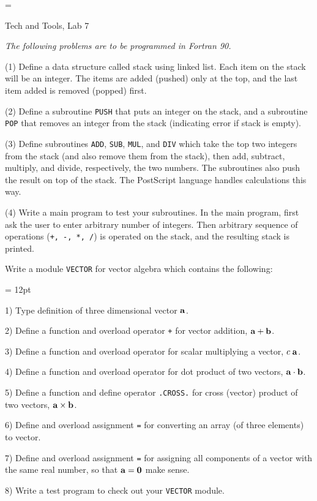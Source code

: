 \magnification=

\nopagenumbers
\centerline{\titlefont Tech and Tools, Lab 7}
\bigskip
{}
\bigskip

{\sl The following problems are to be programmed in Fortran 90.}

\bigskip
\item{} (1) Define a data structure called stack using linked list.
Each item on the stack will be an integer.  The items are added (pushed) 
only at the top, and the last item added is removed (popped) first.
\item{} (2) Define a subroutine {\tt PUSH} that puts an integer on the stack,
and a subroutine {\tt POP} that removes an integer from the stack
(indicating error if stack is empty).
\item{} (3) Define subroutines {\tt ADD}, {\tt SUB}, {\tt MUL}, and {\tt DIV}
which take the top two integers from the stack (and also remove them
from the stack), then add, subtract, multiply, and divide,
respectively, the two numbers.  The subroutines also push the result on 
top of the stack.  The PostScript language handles calculations 
this way.
\item{} (4) Write a main program to test your subroutines.  In the main program,
first ask the user to enter arbitrary number of integers. Then arbitrary
sequence of operations ({\tt +, -, *, /}) is operated on the stack,
and the resulting stack is printed.

\bigskip
{}
\item{} Write a module {\tt VECTOR} for vector algebra which contains the
following:
{\parindent = 12pt
\item{} 1) Type definition of three dimensional vector $\bf a$.
\item{} 2) Define a function and overload operator {\tt +} for vector addition, $\bf a + b$.
\item{} 3) Define a function and overload operator {\tt *} for scalar multiplying a vector, $ c\; \bf a$.
\item{} 4) Define a function and overload operator {\tt *} for dot product of two vectors, $\bf a \cdot b$.
\item{} 5) Define a function and define operator {\tt .CROSS.} for cross (vector) product
of two vectors, $\bf a \times b$.
\item{} 6) Define and overload assignment {\tt =} for converting an array (of three
elements) to vector.
\item{} 7) Define and overload assignment {\tt =} for assigning all components of a
vector with the same real number, so that $\bf a = 0$ make sense. 
\item{} 8) Write a test program to check out your {\tt VECTOR} module.
}

\bye

